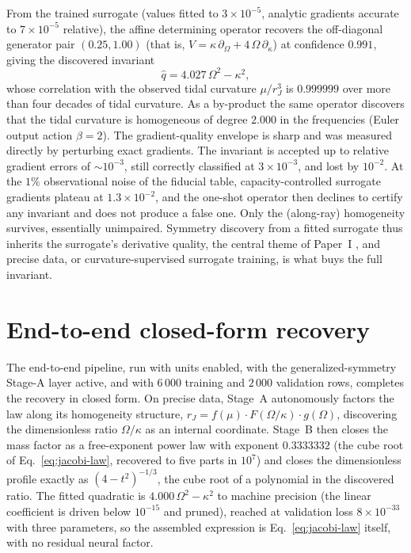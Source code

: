\documentclass[11pt]{article}
\begin{document}
From the trained surrogate (values fitted to $3\times10^{-5}$, analytic
gradients accurate to $7\times10^{-5}$ relative), the affine determining
operator recovers the off-diagonal generator pair $(0.25,1.00)$ (that
is, $V=\kappa\,\partial_\Omega+4\,\Omega\,\partial_\kappa$) at
confidence $0.991$, giving the discovered invariant
%
\begin{equation}
\hat q = 4.027\,\Omega^{2}-\kappa^{2},
\end{equation}
%
whose correlation with the observed tidal curvature $\mu/r_J^{3}$ is
$0.999999$ over more than four decades of tidal curvature.  As a
by-product the same operator discovers that the tidal curvature is
homogeneous of degree $2.000$ in the frequencies (Euler output action
$\beta=2$).  The gradient-quality envelope is sharp and was measured
directly by perturbing exact gradients.  The invariant is accepted up
to relative gradient errors of ${\sim}10^{-3}$, still correctly
classified at $3\times10^{-3}$, and lost by $10^{-2}$.  At the $1\%$
observational noise of the fiducial table, capacity-controlled
surrogate gradients plateau at $1.3\times10^{-2}$, and the one-shot
operator then declines to certify any invariant and does not produce a
false one.  Only the (along-ray) homogeneity survives, essentially
unimpaired.  Symmetry discovery from a fitted surrogate thus inherits
the surrogate's derivative quality, the central theme of Paper~I
\citep{NestyNet2026a}, and precise data, or curvature-supervised
surrogate training, is what buys the full invariant.

\section{End-to-end closed-form recovery}

The end-to-end pipeline, run with units enabled, with the
generalized-symmetry Stage-A layer active, and with $6\,000$ training
and $2\,000$ validation rows, completes the recovery in closed form.
On precise data, Stage~A autonomously factors the law along its
homogeneity structure, $r_J = f(\mu)\cdot F(\Omega/\kappa)\cdot
g(\Omega)$, discovering the dimensionless ratio $\Omega/\kappa$ as an
internal coordinate.  Stage~B then closes the mass factor as a
free-exponent power law with exponent $0.3333332$ (the cube root of
Eq.~\eqref{eq:jacobi-law}, recovered to five parts in $10^{7}$) and
closes the dimensionless profile exactly as $(4-t^{2})^{-1/3}$, the
cube root of a polynomial in the discovered ratio.  The fitted
quadratic is $4.000\,\Omega^{2}-\kappa^{2}$ to machine precision (the
linear coefficient is driven below $10^{-15}$ and pruned), reached at
validation loss $8\times10^{-33}$ with three parameters, so the
assembled expression is Eq.~\eqref{eq:jacobi-law} itself, with no
residual neural factor.
\end{document}
